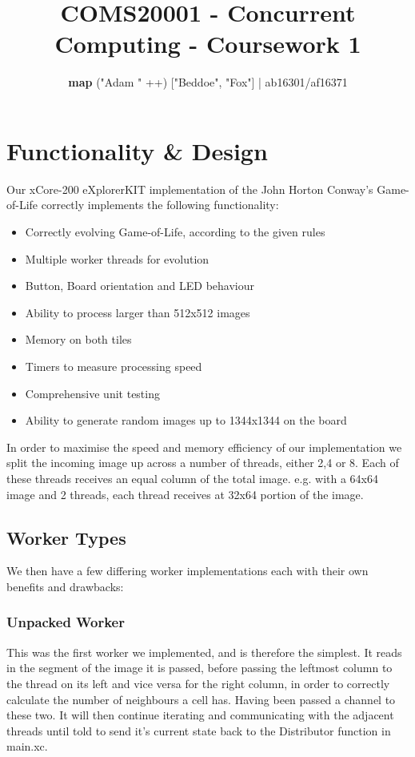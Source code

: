 \documentclass[11pt, oneside]{article}
\title{COMS20001 - Concurrent Computing - Coursework 1}
\author{\textbf{map} ("Adam " ++) ["Beddoe", "Fox"]   |  ab16301/af16371 }
\date{\vspace{-5mm}}
\begin{document}
\maketitle

\section{Functionality \& Design}
Our xCore-200 eXplorerKIT implementation of the John Horton Conway's Game-of-Life correctly implements the following functionality:

\begin{itemize}
\setlength\itemsep{-2mm}
	\item Correctly evolving Game-of-Life, according to the given rules
	\item Multiple worker threads for evolution
	\item Button, Board orientation and LED behaviour
	\item Ability to process larger than 512x512 images
	\item Memory on both tiles
	\item Timers to measure processing speed
	\item Comprehensive unit testing
	\item Ability to generate random images up to 1344x1344 on the board
\end{itemize}

In order to maximise the speed and memory efficiency of our implementation we split the incoming image up across a number of threads, either 2,4 or 8. Each of these threads receives an equal column of the total image. e.g. with a 64x64 image and 2 threads, each thread receives at 32x64 portion of the image.
\vspace{-4mm}

\subsection{Worker Types}
\vspace{-2mm}
We then have a few differing worker implementations each with their own benefits and drawbacks:
\vspace{-8mm}

\subsubsection{Unpacked Worker}
This was the first worker we implemented, and is therefore the simplest. It reads in the segment of the image it is passed, before passing the leftmost column to the thread on its left and vice versa for the right column, in order to correctly calculate the number of neighbours a cell has. Having been passed a channel to these two. It will then continue iterating and communicating with the adjacent threads until told to send it's current state back to the Distributor function in main.xc.
\vspace{-2mm}
\end{document}

